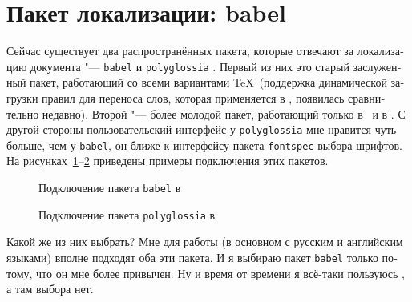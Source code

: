 \documentclass[a4paper,12pt,hyphens]{article}
\newcommand\package[1]{\texttt{#1}}
\begin{document}
\section{Пакет локализации: babel}
Сейчас существует два распространённых пакета, которые отвечают за
локализацию документа "---
\package{babel} \parencite{ctan-babel} и
\package{polyglossia} \parencite{ctan-polyglossia}.
Первый из них это старый заслуженный пакет, работающий со всеми
вариантами \TeX\ (поддержка динамической загрузки правил для
переноса слов, которая применяется в \LuaTeX, появилась сравнительно
недавно). Второй "--- более молодой пакет, работающий только в \XeLaTeX\ и в \LuaLaTeX.
С другой стороны
пользовательский интерфейс у \package{polyglossia} мне нравится чуть больше,
чем у \package{babel}, он ближе к интерфейсу пакета \package{fontspec}
выбора шрифтов. На рисунках~\ref{babel2}--\ref{polygl1}
приведены примеры подключения этих пакетов.
\begin{figure}[tp]
\begin{latexcode}
\usepackage[english,russian]{babel}
\end{latexcode}
\caption{Подключение пакета \package{babel} в \LuaLaTeX}\label{babel2}
\end{figure}
\begin{figure}[tp]
\begin{latexcode}
\usepackage{polyglossia}
\setmainlanguage{russian}
\end{latexcode}
\caption{Подключение пакета \package{polyglossia} в \LuaLaTeX}\label{polygl1}
\end{figure}

Какой же из них выбрать? Мне для работы (в основном с русским и английским языками)
вполне подходят оба эти пакета. И я выбираю пакет \package{babel} только потому, что
он мне более привычен. Ну и время от времени я всё-таки пользуюсь \pdfLaTeX, а там
выбора нет.
\end{document}
